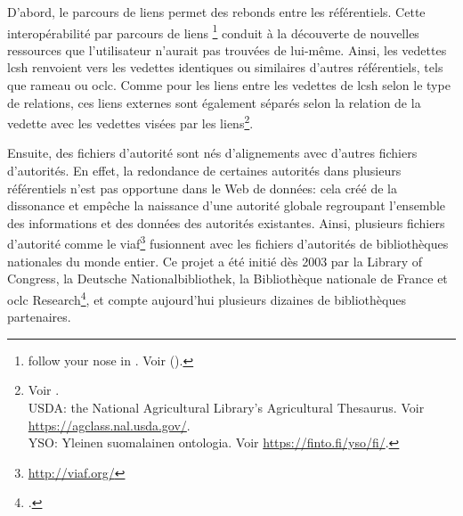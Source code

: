 D'abord, le parcours de liens permet des rebonds entre les référentiels. Cette interopérabilité par parcours de liens \footnote{\og follow your nose\fg{} in \cite{bermes_convergence_2013}. Voir  ().} conduit à la découverte de nouvelles ressources que l'utilisateur n'aurait pas trouvées de lui-même. Ainsi, les vedettes \ac{lcsh} renvoient vers les vedettes identiques ou similaires d'autres référentiels, tels que \ac{rameau} ou \ac{oclc}. Comme pour les liens entre les vedettes de \ac{lcsh} selon le type de relations, ces liens externes sont également séparés selon la relation de la vedette avec les vedettes visées par les liens\footnote{Voir .\\USDA: the National Agricultural Library's Agricultural Thesaurus. Voir \url{https://agclass.nal.usda.gov/}.\\
YSO: Yleinen suomalainen ontologia. Voir \url{https://finto.fi/yso/fi/}.}.


Ensuite, des fichiers d'autorité sont nés d'alignements avec d'autres fichiers d'autorités. En effet, la redondance de certaines autorités dans plusieurs référentiels n'est pas opportune dans le Web de données: cela créé de la dissonance et empêche la naissance d'une autorité globale regroupant l'ensemble des informations et des données des autorités existantes. Ainsi, plusieurs fichiers d'autorité comme le \ac{viaf}\footnote{\url{http://viaf.org/}} fusionnent avec les fichiers d'autorités de bibliothèques nationales du monde entier. Ce projet a été initié dès 2003 par la Library of Congress, la Deutsche Nationalbibliothek, la Bibliothèque nationale de France et \ac{oclc} Research\footcite{bermes_les_2013}, et compte aujourd'hui plusieurs dizaines de bibliothèques partenaires.\\

